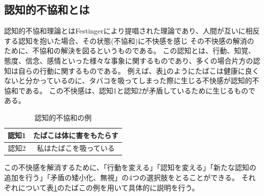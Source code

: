 \documentclass{kuisthesis}
\begin{document}
\subsection{認知的不協和とは} %
\label{sec: CDT}
認知的不協和理論\cite{Festinger1957}とはFestingerにより提唱された理論であり、人間が互いに相反する認知を抱いた場合、その状態(不協和)に不快感を感じ
その不快感の解消のために、不協和の解決を図るというものである。
この認知とは、行動、知覚、態度、信念、感情といった様々な事象に関するものであり、多くの場合片方の認知は自らの行動に関するものである。
例えば、表\ref{fig: CDTExample}のようにたばこは健康に良くないと分かっているのに、タバコを吸ってしまった際に生じる不快感が認知的不協和である。
この不快感は、認知1と認知2が矛盾しているために生じるものである。
\begin{table}[H]
  \centering\caption{認知的不協和の例}
  \label{fig: CDTExample}

  \begin{tabular}{c|c}
      認知1 & たばこは体に害をもたらす  \\ \hline
      認知2 & 私はたばこを吸っている \\ 
  \end{tabular}
  
\end{table}
この不快感を解消するために、「行動を変える」「認知を変える」「新たな認知の追加を行う」「矛盾の矮小化、無視」の4つの選択肢をとることができる。
それぞれについて表\ref{fig: CDTExample}のたばこの例を用いて具体的に説明を行う。
\end{document}
